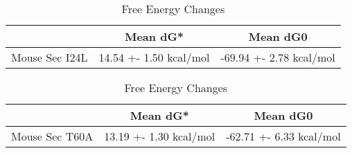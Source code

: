                                                     \begin{table}[ht]
                                                      \centering
                                                      \begin{tabular}{|c|c|c|}
                                                      \hline
                                                        & Mean dG* & Mean dG0 \\
                                                      \hline
                                                      Mouse Sec I24L & 14.54 +- 1.50 kcal/mol & -69.94 +- 2.78 kcal/mol \\
                                                      \hline
                                                      \end{tabular}
                                                      \caption{Free Energy Changes}
                                                      \end{table}

                                                      \begin{table}[ht]
                                                        \centering
                                                        \begin{tabular}{|c|c|c|}
                                                        \hline
                                                          & Mean dG* & Mean dG0 \\
                                                        \hline
                                                        Mouse Sec  T60A & 13.19 +- 1.30 kcal/mol & -62.71 +- 6.33 kcal/mol \\
                                                        \hline
                                                        \end{tabular}
                                                        \caption{Free Energy Changes}
                                                        \end{table}

